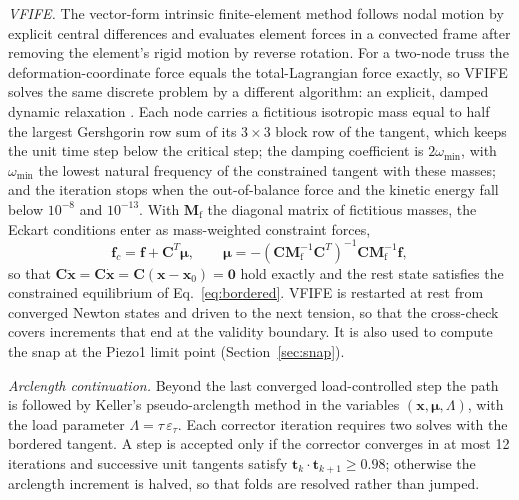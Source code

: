 \documentclass[preprint,12pt,a4paper]{elsarticle}
\newcommand{\x}{\mathbf{x}}
\newcommand{\C}{\mathbf{C}}
\newcommand{\eps}{\varepsilon}
\begin{document}
\emph{VFIFE.} The vector-form intrinsic finite-element method \citep{ting2004,yao2011,wang2021,tan2021} follows nodal motion by explicit central differences and evaluates element forces in a convected frame after removing the element's rigid motion by reverse rotation. For a two-node truss the deformation-coordinate force equals the total-Lagrangian force exactly, so VFIFE solves the same discrete problem by a different algorithm: an explicit, damped dynamic relaxation \citep{ramesh1993,lee2011,alamatian2013,rezaiee2011}. Each node carries a fictitious isotropic mass equal to half the largest Gershgorin row sum of its $3\times3$ block row of the tangent, which keeps the unit time step below the critical step; the damping coefficient is $2\omega_{\min}$, with $\omega_{\min}$ the lowest natural frequency of the constrained tangent with these masses; and the iteration stops when the out-of-balance force and the kinetic energy fall below $10^{-8}$ and $10^{-13}$. With $\mathbf{M}_{\mathrm{f}}$ the diagonal matrix of fictitious masses, the Eckart conditions enter as mass-weighted constraint forces,
\begin{equation}
\mathbf{f}_c=\mathbf{f}+\C^{T}\bm\mu,\qquad
\bm\mu=-(\C\mathbf{M}_{\mathrm{f}}^{-1}\C^{T})^{-1}\C\mathbf{M}_{\mathrm{f}}^{-1}\mathbf{f},
\end{equation}
so that $\C\ddot{\x}=\C\dot{\x}=\C(\x-\x_0)=\mathbf{0}$ hold exactly and the rest state satisfies the constrained equilibrium of Eq.~\eqref{eq:bordered}. VFIFE is restarted at rest from converged Newton states and driven to the next tension, so that the cross-check covers increments that end at the validity boundary. It is also used to compute the snap at the Piezo1 limit point (Section~\ref{sec:snap}).

\emph{Arclength continuation.} Beyond the last converged load-controlled step the path is followed by Keller's pseudo-arclength method \citep{keller1977,riks1979,crisfield1981} in the variables $(\x,\bm\mu,\Lambda)$, with the load parameter $\Lambda=\tau\,\eps_\tau$. Each corrector iteration requires two solves with the bordered tangent. A step is accepted only if the corrector converges in at most 12 iterations and successive unit tangents satisfy $\mathbf{t}_k\cdot\mathbf{t}_{k+1}\ge0.98$; otherwise the arclength increment is halved, so that folds are resolved rather than jumped.
\end{document}
